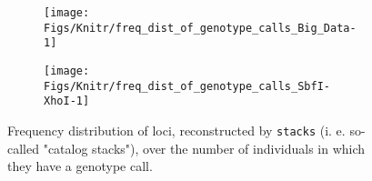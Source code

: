 \documentclass[a4paper,12pt,times,authoryear,twoside,print,index]{Classes/PhDThesisPSnPDF}\usepackage[]{graphicx}\usepackage[]{color}
\newenvironment{knitrout}{}{} %
\begin{document}
\begin{figure}
\centering
\begin{subfigure}[t]{.495\textwidth}
\begin{knitrout}
\color{fgcolor}

{\centering \texttt{[image: Figs/Knitr/freq\_dist\_of\_genotype\_calls\_Big\_Data-1]} 

}



\end{knitrout}
\caption{}
\label{Big_Data:freq_dist_of_genotype_calls}
\end{subfigure}
\hfill
\begin{subfigure}[t]{.495\textwidth}
\begin{knitrout}
\color{fgcolor}

{\centering \texttt{[image: Figs/Knitr/freq\_dist\_of\_genotype\_calls\_SbfI-XhoI-1]} 

}



\end{knitrout}
\caption{}
\label{ddRAD:freq_dist_of_genotype_calls}
\end{subfigure}
\caption{Frequency distribution of loci, reconstructed by \texttt{stacks} (i. e. so-called "catalog stacks"), over the number of individuals in which they have a genotype call.}
\label{freq_dist_of_genotype_calls}
\end{figure}
\end{document}
